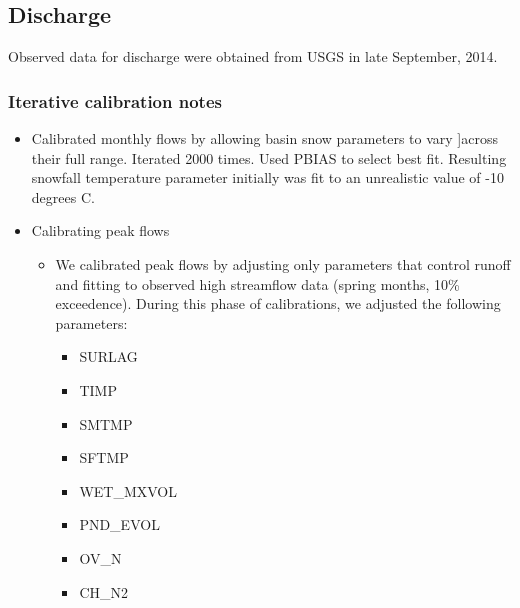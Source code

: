 \subsection{Discharge}
Observed data for discharge were obtained from USGS in late September, 2014.

\subsubsection{Iterative calibration notes}
\begin{itemize}
    \item Calibrated monthly flows by allowing basin snow parameters to vary
    ]across their full range. Iterated 2000 times. Used PBIAS to select best
    fit.
    Resulting snowfall temperature parameter initially was fit to an unrealistic
    value of -10 degrees C.
    \item Calibrating peak flows
    \begin{itemize}
        \item We calibrated peak flows by adjusting only parameters that control
        runoff and fitting to observed high streamflow data (spring months,
        10\% exceedence).
        During this phase of calibrations, we adjusted the following parameters:
        \begin{itemize}
            \item SURLAG
            \item TIMP
            \item SMTMP
            \item SFTMP
            \item WET\_MXVOL
            \item PND\_EVOL
            \item OV\_N
            \item CH\_N2


\end{itemize}
\end{itemize}
\end{itemize}
